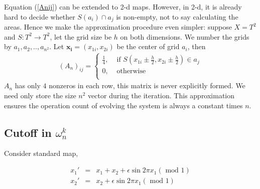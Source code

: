 \documentclass{article}
\begin{document}
Equation (\ref{Anij}) can be extended to 2-d maps. However, in 2-d, it is already hard to decide whether $S(a_i)\cap a_j$ is non-empty, not to say calculating the areas. Hence we make the approximation procedure even simpler: suppose $X = T^2$ and $S: T^2 \rightarrow T^2$, let the grid size be $h$ on both dimensions. We number the grids by $a_1,a_2,.., a_{n^2}$. Let $\mathbf{x_i} =(x_{1i},x_{2i})$ be the center of grid $a_i$, then   
 \begin{eqnarray}
   (A_n)_{ij} =\left\{ \begin{array}{cc}
                     \frac{1}{4}, &\mbox{ if } S(x_{1i}\pm \frac{h}{2},x_{2i}\pm \frac{h}{2}) \in a_j \\
                     0,           &\mbox{ otherwise} \\
                     \end{array} \right.              
 \end{eqnarray}  
$A_n$ has only $4$ nonzeros in each row, this matrix is never explicitly formed. We need only store the size $n^2$ vector during the iteration. This approximation ensures the operation count of evolving the system is always a constant times $n$. 



 
\subsection{Cutoff in $\omega_n^k$}
Consider standard map,

  \begin{eqnarray}
               x_1' &=& x_1+x_2 +\epsilon \sin{2 \pi x_1} (\mbox{ mod } 1) \nonumber\\
               x_2' &=&  x_2 +\epsilon \sin{2 \pi x_1}     (\mbox{ mod } 1)
  \end{eqnarray}
\end{document}
